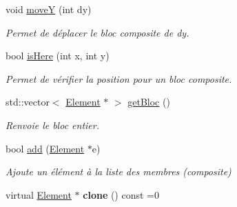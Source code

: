\begin{DoxyCompactItemize}
\mbox{\label{classstate_1_1_element_a26f3b97d04d24f2d2ffa6513099778db}} 
void \hyperlink{classstate_1_1_element_a26f3b97d04d24f2d2ffa6513099778db}{moveY} (int dy)
\begin{DoxyCompactList}\small\item\em Permet de déplacer le bloc composite de dy. \end{DoxyCompactList}\item 
\mbox{\label{classstate_1_1_element_a676d60d605e100796ba0962d7b383415}} 
bool \hyperlink{classstate_1_1_element_a676d60d605e100796ba0962d7b383415}{is\+Here} (int x, int y)
\begin{DoxyCompactList}\small\item\em Permet de vérifier la position pour un bloc composite. \end{DoxyCompactList}\item 
\mbox{\label{classstate_1_1_element_ad4e348a88665a7b251d2a671ad910fae}} 
std\+::vector$<$ \hyperlink{classstate_1_1_element}{Element} $\ast$ $>$ \hyperlink{classstate_1_1_element_ad4e348a88665a7b251d2a671ad910fae}{get\+Bloc} ()
\begin{DoxyCompactList}\small\item\em Renvoie le bloc entier. \end{DoxyCompactList}\item 
\mbox{\label{classstate_1_1_element_a9d35c7951f1aeaeea9775f5151dee98b}} 
bool \hyperlink{classstate_1_1_element_a9d35c7951f1aeaeea9775f5151dee98b}{add} (\hyperlink{classstate_1_1_element}{Element} $\ast$e)
\begin{DoxyCompactList}\small\item\em Ajoute un élément à la liste des membres (composite) \end{DoxyCompactList}\item 
\mbox{\label{classstate_1_1_element_aa11351137acee5ddcf2f5b52fadfda3b}} 
virtual \hyperlink{classstate_1_1_element}{Element} $\ast$ {\bfseries clone} () const =0
\end{DoxyCompactItemize}

